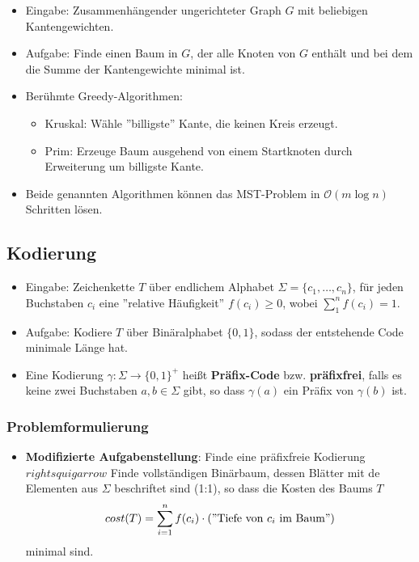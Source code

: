 \documentclass{scrartcl}
\begin{document}
\begin{itemize}
	\item Eingabe: Zusammenhängender ungerichteter Graph $ G $ mit beliebigen Kantengewichten.
	\item Aufgabe: Finde einen Baum in $ G $, der alle Knoten von $ G $ enthält und bei dem die Summe der Kantengewichte minimal ist.
	\item Berühmte Greedy-Algorithmen:
	\begin{itemize}
		\item Kruskal: Wähle ''billigste'' Kante, die keinen Kreis erzeugt.
		\item Prim: Erzeuge Baum ausgehend von einem Startknoten durch Erweiterung um billigste Kante.
	\end{itemize}
	\item Beide genannten Algorithmen können das MST-Problem in $ \mathcal{O}(m \log n) $ Schritten lösen.
\end{itemize}

\subsection{Kodierung}

\begin{itemize}
	\item Eingabe: Zeichenkette $ T $ über endlichem Alphabet $ \Sigma = \{ c_1,\ldots,c_n \} $, für jeden Buchstaben $ c_i $ eine ''relative Häufigkeit'' $ f(c_i) \geq 0 $, wobei $ \sum_{1}^{n} f(c_i) = 1 $.
	\item Aufgabe: Kodiere $ T $ über Binäralphabet $ \{ 0,1 \} $, sodass der entstehende Code minimale Länge hat.
	\item Eine Kodierung $ \gamma: \Sigma \rightarrow \{ 0,1 \}^+ $ heißt \textbf{Präfix-Code} bzw. \textbf{präfixfrei}, falls es keine zwei Buchstaben $ a,b \in \Sigma $ gibt, so dass $ \gamma(a) $ ein Präfix von $ \gamma(b) $ ist.
\end{itemize}

\subsubsection{Problemformulierung}

\begin{itemize}
	\item \textbf{Modifizierte Aufgabenstellung}: Finde eine präfixfreie Kodierung $ rightsquigarrow $ Finde vollständigen Binärbaum, dessen Blätter mit de Elementen aus $ \Sigma $ beschriftet sind (1:1), so dass die Kosten des Baums $ T $
	\[ cost(T) = \sum_{i=1}^{n} f(c_i) \cdot (\text{''Tiefe von $ c_i $ im Baum''}) \]
	minimal sind.
\end{itemize}
\end{document}
